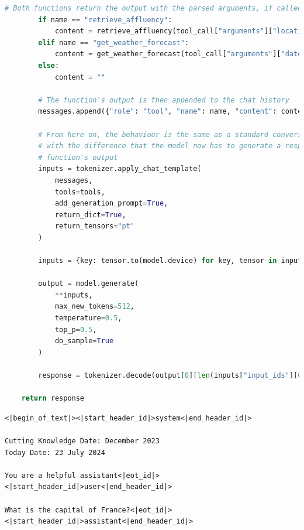 \begin{center}
\begin{lstlisting}[language=Python, frame=single, caption=\texttt{generate\_response()} Function.]
        # Both functions return the output with the parsed arguments, if called
        if name == "retrieve_affluency":
            content = retrieve_affluency(tool_call["arguments"]["location"], tool_call["arguments"]["date"])
        elif name == "get_weather_forecast":
            content = get_weather_forecast(tool_call["arguments"]["date"])
        else:
            content = ""

        # The function's output is then appended to the chat history
        messages.append({"role": "tool", "name": name, "content": content})

        # From here on, the behaviour is the same as a standard conversation,
        # with the difference that the model now has to generate a response based on the 
        # function's output
        inputs = tokenizer.apply_chat_template(
            messages,
            tools=tools,
            add_generation_prompt=True,
            return_dict=True,
            return_tensors="pt"
        )

        inputs = {key: tensor.to(model.device) for key, tensor in inputs.items()}

        output = model.generate(
            **inputs,
            max_new_tokens=512,
            temperature=0.5,
            top_p=0.5,
            do_sample=True
        )

        response = tokenizer.decode(output[0][len(inputs["input_ids"][0]):], skip_special_tokens=True)

    return response
\end{lstlisting}
\end{center}


\begin{Verbatim}[breaklines=true]
<|begin_of_text|><|start_header_id|>system<|end_header_id|>

Cutting Knowledge Date: December 2023
Today Date: 23 July 2024
    
You are a helpful assistant<|eot_id|><|start_header_id|>user<|end_header_id|>
    
What is the capital of France?<|eot_id|><|start_header_id|>assistant<|end_header_id|>
\end{Verbatim}

